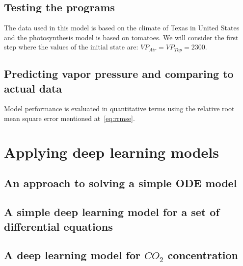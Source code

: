\documentclass[a4paper]{article}
\begin{document}
\subsection{Testing the programs}
The data used in this model is based on the climate of Texas in United States and the photosynthesis model is based on tomatoes.
We will consider the first step where the values of the initial state are: \(VP_{Air} = VP_{Top} = 2300\).

\subsection{Predicting vapor pressure and comparing to actual data}
Model performance is evaluated in quantitative terms using the relative root mean square error mentioned at~\eqref{eq:rrmse}.

\newpage
\section{Applying deep learning models}
\subsection{An approach to solving a simple ODE model}

\subsection{A simple deep learning model for a set of differential equations}

\subsection{A deep learning model for \texorpdfstring{\(CO_2\)}{} concentration}

\newpage

\printbibliography[heading=bibintoc]
\end{document}
